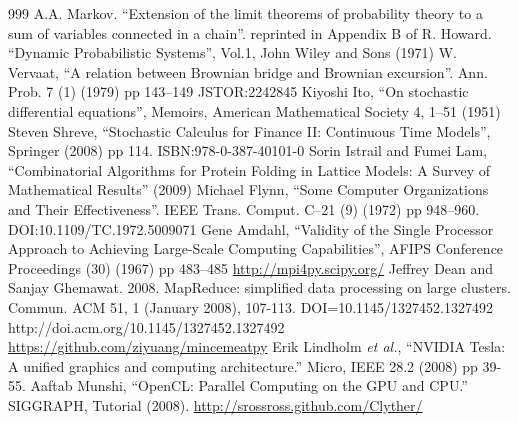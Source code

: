 \documentclass[justified, sixbynine]{tufte-book}
\theoremstyle{plain}%
\newtheorem * {corollary}{Corollary}
\theoremstyle{definition}
\theoremstyle{remark}
\newtheorem * {remark}{Remark}
\newtheorem * {note}{Note}
\begin{document}
\begin{thebibliography}{999}
 A.A. Markov. ``Extension of the limit theorems of probability theory to a sum of variables connected in a chain''. reprinted in Appendix B of R. Howard. ``Dynamic Probabilistic Systems'', Vol.1, John Wiley and Sons (1971)
 W. Vervaat, ``A relation between Brownian bridge and Brownian excursion''. Ann. Prob. 7 (1) (1979) pp 143–149 JSTOR:2242845
 Kiyoshi Ito, ``On stochastic differential equations'', Memoirs, American Mathematical Society 4, 1–51 (1951)
 Steven Shreve, ``Stochastic Calculus for Finance II: Continuous Time Models'', Springer (2008) pp 114. ISBN:978-0-387-40101-0
 Sorin Istrail and Fumei Lam, ``Combinatorial Algorithms for Protein Folding in Lattice Models: A Survey of Mathematical Results'' (2009)
 Michael Flynn, ``Some Computer Organizations and Their Effectiveness''. IEEE Trans. Comput. C–21 (9) (1972) pp 948–960. DOI:10.1109/TC.1972.5009071
 Gene Amdahl, ``Validity of the Single Processor Approach to Achieving Large-Scale Computing Capabilities'', AFIPS Conference Proceedings (30) (1967) pp 483–485
 \url{http://mpi4py.scipy.org/}
 Jeffrey Dean and Sanjay Ghemawat. 2008. MapReduce: simplified data processing on large clusters. Commun. ACM 51, 1 (January 2008), 107-113. DOI=10.1145/1327452.1327492 http://doi.acm.org/10.1145/1327452.1327492
 \url{https://github.com/ziyuang/mincemeatpy}
 Erik Lindholm {\it et al.}, ``NVIDIA Tesla: A unified graphics and computing architecture.'' Micro, IEEE 28.2 (2008) pp 39-55.
 Aaftab Munshi, ``OpenCL: Parallel Computing on the GPU and CPU.'' SIGGRAPH, Tutorial (2008).
 \url{http://srossross.github.com/Clyther/}
\end{thebibliography}
\end{document}
